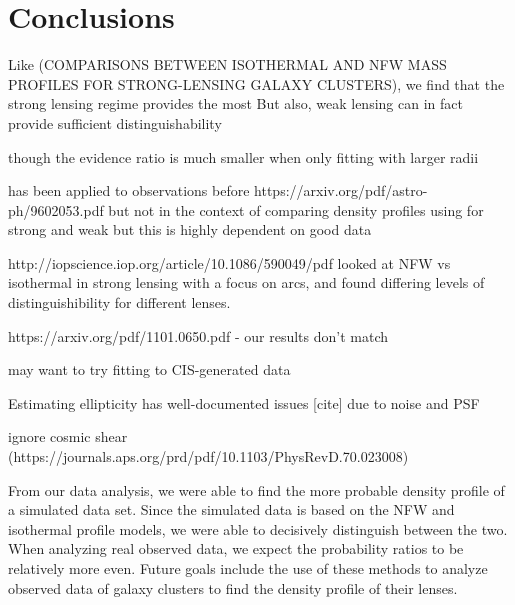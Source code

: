 \documentclass[10pt]{article}
\begin{document}
\section{Conclusions}

Like (COMPARISONS BETWEEN ISOTHERMAL AND NFW MASS PROFILES
FOR STRONG-LENSING GALAXY CLUSTERS), we find that the strong lensing regime provides the most
But also, weak lensing can in fact provide sufficient distinguishability

though the evidence ratio is much smaller when only fitting with larger radii

has been applied to observations before
https://arxiv.org/pdf/astro-ph/9602053.pdf
but not in the context of comparing density profiles using for strong and weak
but this is highly dependent on good data

http://iopscience.iop.org/article/10.1086/590049/pdf looked at NFW vs isothermal in strong lensing with a focus on arcs, and found differing levels of distinguishibility for different lenses.

https://arxiv.org/pdf/1101.0650.pdf - our results don't match

may want to try fitting to CIS-generated data

Estimating ellipticity has well-documented issues [cite] due to noise and PSF


ignore cosmic shear (https://journals.aps.org/prd/pdf/10.1103/PhysRevD.70.023008)

From our data analysis, we were able to find the more probable density profile of a simulated data set.
Since the simulated data is based on the NFW and isothermal profile models, we were able to decisively distinguish between the two.
When analyzing real observed data, we expect the probability ratios to be relatively more even.
Future goals include the use of these methods to analyze observed data of galaxy clusters to find the density profile of their lenses.





\end{document}

